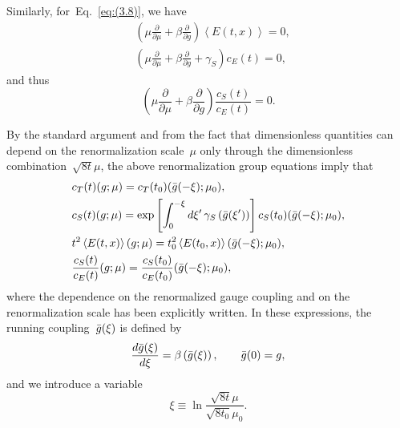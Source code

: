 Similarly, for~Eq.~\eqref{eq:(3.8)}, we have
\begin{align}
   &\left(\mu\frac{\partial}{\partial\mu}
   +\beta\frac{\partial}{\partial g}\right)
   \left\langle E(t,x)\right\rangle=0,
\label{eq:(4.8)}
\\
   &\left(\mu\frac{\partial}{\partial\mu}
   +\beta\frac{\partial}{\partial g}
   +\gamma_S\right)c_E(t)=0,
\label{eq:(4.9)}
\end{align}
and thus
\begin{equation}
   \left(\mu\frac{\partial}{\partial\mu}
   +\beta\frac{\partial}{\partial g}\right)\frac{c_S(t)}{c_E(t)}=0.
\label{eq:(4.10)}
\end{equation}

By the standard argument and from the fact that dimensionless quantities can
depend on the renormalization scale~$\mu$ only through the dimensionless
combination~$\sqrt{8t}\mu$, the above renormalization group equations imply
that
\begin{align}
   &c_T(t)(g;\mu)=c_T(t_0)(\Bar{g}(-\xi);\mu_0),
\label{eq:(4.11)}
\\
   &c_S(t)(g;\mu)
   =\exp\left[\int_0^{-\xi}d\xi'\,\gamma_S\left(\Bar{g}(\xi')\right)\right]
   c_S(t_0)(\Bar{g}(-\xi);\mu_0),
\label{eq:(4.12)}
\\
   &t^2\left\langle E(t,x)\right\rangle(g;\mu)
   =t_0^2\left\langle E(t_0,x)\right\rangle(\Bar{g}(-\xi);\mu_0),
\label{eq:(4.13)}
\\
   &\frac{c_S(t)}{c_E(t)}(g;\mu)=\frac{c_S(t_0)}{c_E(t_0)}(\Bar{g}(-\xi);\mu_0),
\label{eq:(4.14)}
\end{align}
where the dependence on the renormalized gauge coupling and on the
renormalization scale has been explicitly written. In these expressions, the
running coupling~$\Bar{g}(\xi)$ is defined by
\begin{equation}
   \frac{d\Bar{g}(\xi)}{d\xi}=\beta\left(\Bar{g}(\xi)\right),\qquad
   \Bar{g}(0)=g,
\label{eq:(4.15)}
\end{equation}
and we introduce a variable
\begin{equation}
   \xi\equiv\ln\frac{\sqrt{8t}\mu}{\sqrt{8t_0}\mu_0}.
\label{eq:(4.16)}
\end{equation}

